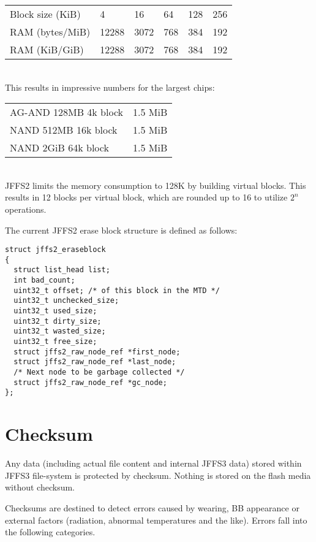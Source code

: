 \documentclass[12pt,a4paper,oneside,titlepage]{article}
\begin{document}
\begin{tabular}{llllll}
Block size (KiB) & 4	 & 16   & 64  & 128 & 256 \\
RAM (bytes/MiB)  & 12288 & 3072 & 768 & 384 & 192 \\
RAM (KiB/GiB)    & 12288 & 3072 & 768 & 384 & 192 \\
\end{tabular}\\

This results in impressive numbers for the largest chips:\\

\begin{tabular}{ll}
AG-AND 128MB 4k block & 1.5 MiB \\
NAND 512MB 16k block  & 1.5 MiB \\
NAND 2GiB 64k block   & 1.5 MiB \\
\end{tabular}\\

JFFS2 limits the memory consumption to 128K by building virtual
blocks. This results in 12 blocks per virtual block,
which are rounded up to 16 to utilize $2^n$ operations.

The current JFFS2 erase block structure is defined as follows:

\begin{verbatim}
struct jffs2_eraseblock
{
  struct list_head list;
  int bad_count;
  uint32_t offset; /* of this block in the MTD */
  uint32_t unchecked_size;
  uint32_t used_size;
  uint32_t dirty_size;
  uint32_t wasted_size;
  uint32_t free_size;
  struct jffs2_raw_node_ref *first_node;
  struct jffs2_raw_node_ref *last_node;
  /* Next node to be garbage collected */
  struct jffs2_raw_node_ref *gc_node; 
};
\end{verbatim}

%
%
\section{Checksum}
Any data (including actual file content and internal JFFS3 data) stored within
JFFS3 file-system is protected by checksum. Nothing is stored on the flash media
without checksum.

Checksums are destined to detect errors caused by wearing, BB appearance
or external factors (radiation, abnormal temperatures and the
like). Errors fall into the following categories.
\end{document}
